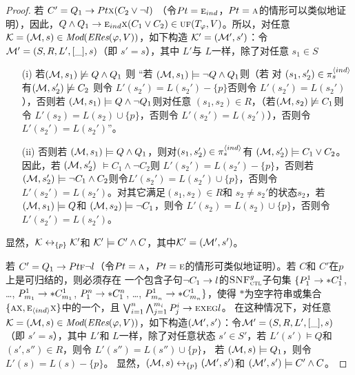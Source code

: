 \begin{proof}
	若 $C'= Q_1\rightarrow Pt \textsc{x} (C_2 \vee \neg l)$ （令$Pt=\textsc{e}_{ind}$，$Pt = \textsc{a}$的情形可以类似地证明），因此，$Q \wedge Q_1 \rightarrow \textsc{e}_{ind} \textsc{x}(C_1 \vee C_2) \in \textsc{uf}(T_\varphi,V)$。所以，对任意 ${\cal K}=({\cal M}, s)\in \textit{Mod}(\emph{ERes}(\varphi,V))$，如下构造 ${\cal K}'=({\cal M}',s')$：令${\cal M}'= (S, R, L', [\_], s)$（即 $s'=s$），其中 $L'$与 $L$一样，除了对任意 $s_1\in S$
	\begin{itemize}
		\item[(i)] 若$({\cal M}, s_1) \not \models Q \wedge Q_1$ 则 “若 $({\cal M}, s_1) \models \neg Q \wedge Q_1$则（若 对 $(s_1, s_2') \in \pi_s^{{\langle{ind}\rangle}}$有$({\cal M}, s_2') \not \models C_2$  则令 $L'(s_2') = L(s_2') - \{p\}$否则令 $L'(s_2') = L(s_2')$），否则若 $({\cal M}, s_1) \models Q \wedge \neg Q_1$则对任意 $(s_1, s_2) \in R$，（若$({\cal M}, s_2) \not \models C_1$则令 $L'(s_2) = L(s_2) \cup \{p\}$，否则令 $L'(s_2') = L(s_2')$），否则令 $L'(s_2') = L(s_2')$”。
		\item[(ii)] 否则若 $({\cal M}, s_1) \models Q \wedge Q_1$，则对$(s_1, s_2') \in \pi_s^{{\langle{ind}\rangle}}$有 $({\cal M},s_2') \models C_1 \vee C_2$。因此，若 $({\cal M}, s_2')$ $\models C_1 \wedge \neg C_2$则 $L'(s_2') = L(s_2') - \{p\}$，否则若 $({\cal M}, s_2') \models \neg C_1 \wedge C_2$则令$L'(s_2') = L(s_2') \cup \{p\}$，否则令 $L'(s_2') = L(s_2')$。对其它满足$(s_1, s_2) \in R$和 $s_2 \not = s_2'$的状态$s_2$，若 $({\cal M}, s_1) \models Q$和 $({\cal M}, s_2) \models \neg C_1$，则令 $L'(s_2) = L(s_2) \cup \{p\}$，否则令 $L'(s_2') = L(s_2')$。
	\end{itemize}
	显然，${\cal K} \leftrightarrow_{\{p\}} {\cal K}'$和 ${\cal K}' \models C' \wedge C$，其中${\cal K}' = ({\cal M}',s')$。
	
	若 $C' =  Q_1\rightarrow Pt \textsc{f} \neg l$（令$Pt=\textsc{a}$，$Pt = \textsc{e}$的情形可类似地证明）。若 $C$和 $C'$在$p$上是可归结的，则必须存在 一个包含子句$\neg C_1 \rightarrow l$的${\textsc{SNF}_{\textsc{ctl}}^g}$子句集 $\{P_1^1 \rightarrow * C_1^1$, \dots, $P_{m_1}^1 \rightarrow * C_{m_1}^1$, $P_1^n \rightarrow * C_1^n$, \dots, $P_{m_n}^1 \rightarrow * C_{m_n}^1 \}$，使得 $*$为空字符串或集合 $\{\textsc{a} \textsc{x}, \textsc{e}_{{\langle{ind}\rangle}} \textsc{x}\}$中的一个，且 $\bigvee_{i=1}^n \bigwedge_{j=1}^{m_i} P_j^i \rightarrow \textsc{e} \textsc{x} \textsc{e} \textsc{g} l$。
	在这种情况下，对任意${\cal K}=({\cal M}, s)\in \textit{Mod}(\emph{ERes}(\varphi,V))$，如下构造$({\cal M}',s')$：令${\cal M}'= (S, R, L', [\_],s)$ （即 $s'=s$），其中  $L'$和 $L$一样，除了对任意状态 $s'\in S'$，若 $L'(s') \models Q$和 $(s',s'') \in R$，则令 $L'(s'') = L(s'') \cup \{p\}$， 若 $({\cal M},s)\models Q_1$，则令 $L'(s) = L(s) - \{p\}$。
	显然，$({\cal M}, s) \leftrightarrow_{\{p\}} ({\cal M}', s')$和 $({\cal M}',s') \models C' \wedge C$。	
	

\end{proof}
